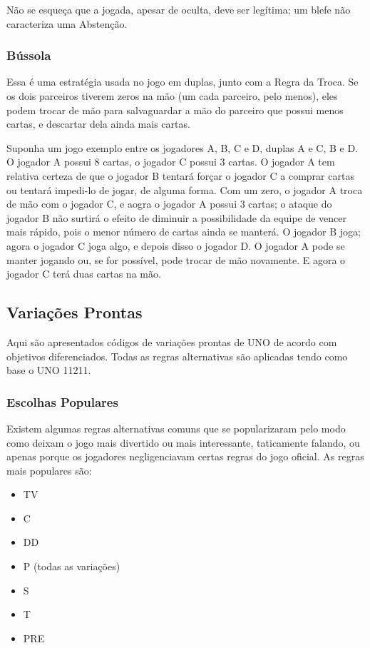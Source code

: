 Não se esqueça que a jogada, apesar de oculta, deve ser legítima; um blefe não caracteriza uma Abstenção.

\subsubsection{Bússola}

Essa é uma estratégia usada no jogo em duplas, junto com a Regra da Troca. Se os dois parceiros tiverem zeros na mão (um cada parceiro, pelo menos), eles podem trocar de mão para salvaguardar a mão do parceiro que possui menos cartas, e descartar dela ainda mais cartas.

Suponha um jogo exemplo entre os jogadores A, B, C e D, duplas A e C, B e D. O jogador A possui 8 cartas, o jogador C possui 3 cartas. O jogador A tem relativa certeza de que o jogador B tentará forçar o jogador C a comprar cartas ou tentará impedi-lo de jogar, de alguma forma. Com um zero, o jogador A troca de mão com o jogador C, e aogra o jogador A possui 3 cartas; o ataque do jogador B não surtirá o efeito de diminuir a possibilidade da equipe de vencer mais rápido, pois o menor número de cartas ainda se manterá. O jogador B joga; agora o jogador C joga algo, e depois disso o jogador D.  O jogador A pode se manter jogando ou, se for possível, pode trocar de mão novamente. E agora o jogador C terá duas cartas na mão.

\subsection{Variações Prontas}

Aqui são apresentados códigos de variações prontas de UNO de acordo com objetivos diferenciados. Todas as regras alternativas são aplicadas tendo como base o UNO 11211.

\subsubsection{Escolhas Populares}

Existem algumas regras alternativas comuns que se popularizaram pelo modo como deixam o jogo mais divertido ou mais interessante, taticamente falando, ou apenas porque os jogadores negligenciavam certas regras do jogo oficial. As regras mais populares são:

\begin{itemize}
\item{TV}
\item{C}
\item{DD}
\item{P (todas as variações)}
\item{S}
\item{T}
\item{PRE}
\end{itemize}

